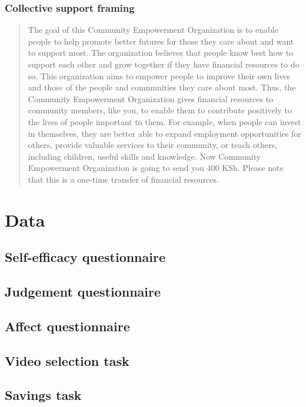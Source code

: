 \documentclass[11pt, a4paper]{article}\usepackage[]{graphicx}\usepackage[]{color}
\begin{document}
        \subsubsection{Collective support framing}

            \begin{quote}

                The goal of this Community Empowerment Organization is to enable people to help promote better futures for those they care about and want to support most. The organization believes that people know best how to support each other and grow together if they have financial resources to do so. This organization aims to empower people to improve their own lives and those of the people and communities they care about most. Thus, the Community Empowerment Organization gives financial resources to community members, like you, to enable them to contribute positively to the lives of people important to them. For example, when people can invest in themselves, they are better able to expand employment opportunities for others, provide valuable services to their community, or teach others, including children, useful skills and knowledge. Now Community Empowerment Organization is going to send you 400 KSh. Please note that this is a one-time transfer of financial resources.

            \end{quote}

\section{Data}

    \subsection{Self-efficacy questionnaire}
    \subsection{Judgement questionnaire}
    \subsection{Affect questionnaire}
    \subsection{Video selection task}
    \subsection{Savings task}
\end{document}
